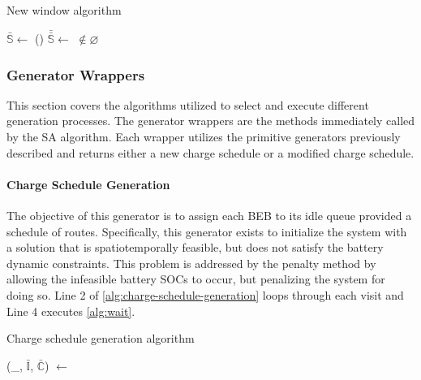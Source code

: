 \documentclass[11pt,a4paper,final]{article}
\newcommand{\I}{\mathbb{I}}                 %
\newcommand{\C}{\mathbb{C}}                 %
\newcommand{\Sol}{\mathbb{S}}               %
\begin{document}
\begin{algorithm}[H]
  \caption{New window algorithm} \label{alg:new-window}
  \LinesNumbered
  \KwIn{$\Sol$}
  \KwOut{$\bar{\Sol}$}


  \Begin
  {
    $\bar{\Sol} \leftarrow$\Purge{$\Sol$}
    \If()
       {
         $\bar{\bar{\Sol}} \leftarrow$ \NewVisit{$\bar{\Sol}$} $\not\in \varnothing$
       }
       {
         \Return{$\bar{\bar{\Sol}}$} 
       }

       \Return{($\varnothing$)}
  }
\end{algorithm}

\subsubsection{Generator Wrappers}
\label{sec:generator-wrappers}
This section covers the algorithms utilized to select and execute different generation processes. The generator wrappers
are the methods immediately called by the SA algorithm. Each wrapper utilizes the primitive generators previously
described and returns either a new charge schedule or a modified charge schedule.

\paragraph{Charge Schedule Generation}
\label{sec:charge-schedule-generation}
The objective of this generator is to assign each BEB to its idle queue provided a schedule of routes. Specifically,
this generator exists to initialize the system with a solution that is spatiotemporally feasible, but does not satisfy
the battery dynamic constraints. This problem is addressed by the penalty method by allowing the infeasible battery SOCs
to occur, but penalizing the system for doing so. Line 2 of \ref{alg:charge-schedule-generation} loops through each
visit and Line 4 executes \ref{alg:wait}.

\begin{algorithm}[H]
\caption{Charge schedule generation algorithm} \label{alg:charge-schedule-generation}
    \LinesNumbered
    \KwIn{$\I$, $\C$}
    \KwOut{$\bar{\I}$, $\bar{\C}$}


    \Begin
    {
        \ForEach {$\I_i \in \I$}
        {
            (\_, $\bar{\I}$, $\bar{\C}$) $\leftarrow$ \Wait{($\I_i$, $\I$, $\C$)}
        }
            \Return{($\bar{\I}$, $\bar{\C}$)}
    }
  \end{algorithm}
\end{document}
